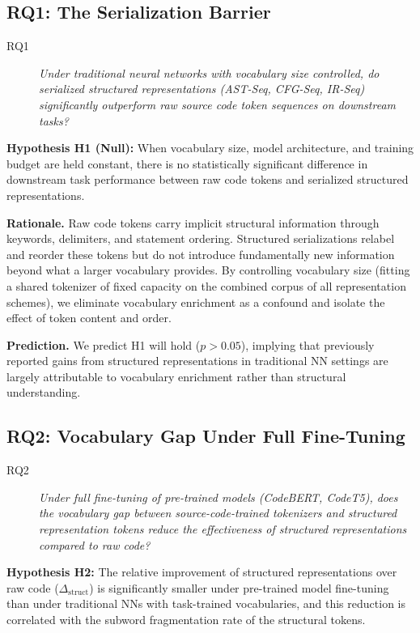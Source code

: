 \documentclass[pdflatex,sn-mathphys,Numbered]{sn-jnl}
\begin{document}
\subsection{RQ1: The Serialization Barrier}

\begin{description}
\item[RQ1] \textit{Under traditional neural networks with vocabulary size controlled, do serialized structured representations (AST-Seq, CFG-Seq, IR-Seq) significantly outperform raw source code token sequences on downstream tasks?}
\end{description}

\textbf{Hypothesis H1 (Null):} When vocabulary size, model architecture, and training budget are held constant, there is no statistically significant difference in downstream task performance between raw code tokens and serialized structured representations.

\textbf{Rationale.} Raw code tokens carry implicit structural information through keywords, delimiters, and statement ordering. Structured serializations relabel and reorder these tokens but do not introduce fundamentally new information beyond what a larger vocabulary provides. By controlling vocabulary size (fitting a shared tokenizer of fixed capacity on the combined corpus of all representation schemes), we eliminate vocabulary enrichment as a confound and isolate the effect of token content and order.

\textbf{Prediction.} We predict H1 will hold ($p > 0.05$), implying that previously reported gains from structured representations in traditional NN settings are largely attributable to vocabulary enrichment rather than structural understanding.

\subsection{RQ2: Vocabulary Gap Under Full Fine-Tuning}

\begin{description}
\item[RQ2] \textit{Under full fine-tuning of pre-trained models (CodeBERT, CodeT5), does the vocabulary gap between source-code-trained tokenizers and structured representation tokens reduce the effectiveness of structured representations compared to raw code?}
\end{description}

\textbf{Hypothesis H2:} The relative improvement of structured representations over raw code ($\Delta_{\text{struct}}$) is significantly smaller under pre-trained model fine-tuning than under traditional NNs with task-trained vocabularies, and this reduction is correlated with the subword fragmentation rate of the structural tokens.
\end{document}

